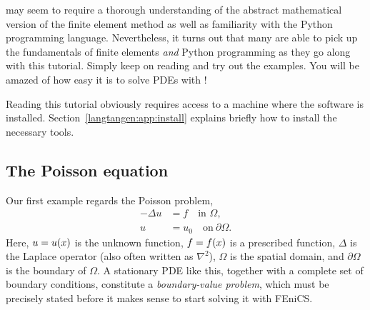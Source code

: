 \fenics{} may seem to require a thorough understanding of the abstract
mathematical version of the finite element method as well as familiarity
with the Python programming language.  Nevertheless, it turns out that
many are able to pick up the fundamentals of finite elements \emph{and}
Python programming as they go along with this tutorial. Simply keep on
reading and try out the examples. You will be amazed of how easy it is
to solve PDEs with \fenics{}!


Reading this tutorial obviously requires access to a machine where the
\fenics{} software is installed. Section~\ref{langtangen:app:install}
explains briefly how to install the necessary tools.

\subsection{The Poisson equation}
\label{langtangen:poisson1:bvp}

Our first example regards the Poisson problem,
\begin{equation} \label{langtangen:poisson1}
  \begin{split}
    - \Delta u &= f \quad \mbox{in } \Omega,
    \\
    u &= u_0 \quad \mbox{on} \  \partial \Omega.
  \end{split}
\end{equation}
Here, $u = u({x})$ is the unknown function, $f =
f({x})$ is a prescribed function, $\Delta$ is the Laplace
operator (also often written as $\nabla^2$), $\Omega$ is the spatial
domain, and $\partial\Omega$ is the boundary of $\Omega$. A stationary
PDE like this, together with a complete set of boundary conditions,
constitute a \emph{boundary-value problem}, which must be precisely
stated before it makes sense to start solving it with FEniCS.

